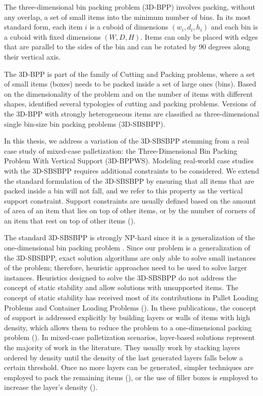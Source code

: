 The three-dimensional bin packing problem (3D-BPP) involves packing, without any overlap, a set of small items into the minimum number of bins.
In its most standard form, each item $i$ is a cuboid of dimensions $(w_i, d_i, h_i)$ and each bin is a cuboid with fixed dimensions $(W, D, H)$.
Items can only be placed with edges that are parallel to the sides of the bin and can be rotated by $90$ degrees along their vertical axis.

The 3D-BPP is part of the family of Cutting and Packing problems, where a set of small items (boxes) needs to be packed inside a set of large ones (bins).
Based on the dimensionality of the problem and on the number of items with different shapes, \cite{WASCHER20071109} identified several typologies of cutting and packing problems.
Versions of the 3D-BPP with strongly heterogeneous items are classified as three-dimensional single bin-size bin packing problems (3D-SBSBPP). 

In this thesis, we address a variation of the 3D-SBSBPP stemming from a real case study of mixed-case palletization: the Three-Dimensional Bin Packing Problem With Vertical Support (3D-BPPWS).
Modeling real-world case studies with the 3D-SBSBPP requires additional constraints to be considered. We extend the standard formulation of the 3D-SBSBPP by ensuring that all items that are packed inside a bin will not fall, and we refer to this property as the vertical support constraint.
Support constraints are usually defined based on the amount of area of an item that lies on top of other items, or by the number of corners of an item that rest on top of other items (\cite{GZARA20201062, paquay2016mixed, kurpel2020exact}).

The standard 3D-SBSBPP is strongly NP-hard since it is a generalization of the one-dimensional bin packing problem \citep{martello2000three}.
Since our problem is a generalization of the 3D-SBSBPP, exact solution algorithms are only able to solve small instances of the problem; therefore, heuristic approaches need to be used to solve larger instances.
Heuristics designed to solve the 3D-SBSBPP do not address the concept of static stability and allow solutions with unsupported items.
The concept of static stability has received most of its contributions in Pallet Loading Problems and Container Loading Problems (\cite{Calzavara2021, kurpel2020exact}).
In these publications, the concept of support is addressed explicitly by building layers or walls of items with high density, which allows them to reduce the problem to a one-dimensional packing problem (\cite{BORTFELDT20131}).
In mixed-case palletization scenarios, layer-based solutions represent the majority of work in the literature. They usually work by stacking layers ordered by density until the density of the last generated layers falls below a certain threshold.
Once no more layers can be generated, simpler techniques are employed to pack the remaining items (\cite{elhedhli2019three}), or the use of filler boxes is employed to increase the layer's density (\cite{Calzavara2021}).

